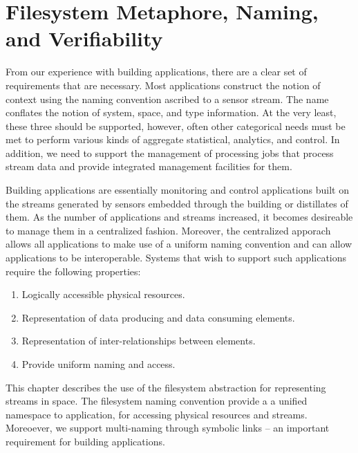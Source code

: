 \chapter{Filesystem Metaphore, Naming, and Verifiability}

From our experience with building applications, there are a clear set of requirements that are necessary.  Most applications
construct the notion of context using the naming convention ascribed to a sensor stream.  The name conflates the notion of system,
space, and type information.  At the very least, these three should be supported, however, often other categorical needs must be
met to perform various kinds of aggregate statistical, analytics, and control.  In addition, we need to support the management of
processing jobs that process stream data and provide integrated management facilities for them.

Building applications are essentially monitoring and control applications built on the streams generated by sensors embedded through
the building or distillates of them.  As the number of applications and streams increased, it becomes desireable to manage them 
in a centralized fashion.  Moreover, the centralized apporach allows all applications to make use of a uniform naming convention and
can allow applications to be interoperable.  Systems that wish to support such applications require the following properties:

\begin{enumerate}
\item Logically accessible physical resources.
\item Representation of data producing and data consuming elements.
\item Representation of inter-relationships between elements.
\item Provide uniform naming and access.
\end{enumerate}

This chapter describes the use of the filesystem abstraction for representing streams in space.  The filesystem naming convention
provide a a unified namespace to application, for accessing physical resources and streams.  Moreoever, we support multi-naming through
symbolic links -- an important requirement for building applications.  









